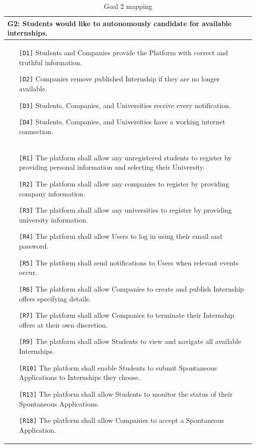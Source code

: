\clearpage
\begin{table}[H]
    \centering
    \begin{tabular}{|p{15cm}|}
         \hline
        \textbf{G2:} Students would like to autonomously candidate for available internships. \\ \hline
        \begin{itemize}
            \item[\texttt{[D1]}] Students and Companies provide the Platform with correct and truthful information. 
            \item[\texttt{[D2]}] Companies remove published Internship if they are no longer available.
            \item[\texttt{[D3]}] Students, Companies, and Universities receive every notification.
            \item[\texttt{[D4]}] Students, Companies, and Universities have a working internet connection.
        \end{itemize} \\ \hline
        \begin{itemize}
            \item[\texttt{[R1]}] The platform shall allow any unregistered students to register by providing personal information and selecting their University.
            \item[\texttt{[R2]}] The platform shall allow any companies to register by providing company information.
            \item[\texttt{[R3]}] The platform shall allow any universities to register by providing university information.
            \item[\texttt{[R4]}] The platform shall allow Users to log in using their email and password.
            \item[\texttt{[R5]}] The platform shall send notifications to Users when relevant events occur.
            \item[\texttt{[R6]}] The platform shall allow Companies to create and publish Internship offers specifying details.
            \item[\texttt{[R7]}] The platform shall allow Companies to terminate their Internship offers at their own discretion.
            \item[\texttt{[R9]}] The platform shall allow Students to view and navigate all available Internships.
            \item[\texttt{[R10]}] The platform shall enable Students to submit Spontaneous Applications to Internships they choose.
            \item[\texttt{[R13]}] The platform shall allow Students to monitor the status of their Spontaneous Applications.
            \item[\texttt{[R18]}] The platform shall allow Companies to accept a Spontaneous Application.
        \end{itemize} \\ \hline
    \end{tabular}
    \caption{Goal 2 mapping}
    \label{tab:G2}
\end{table}

